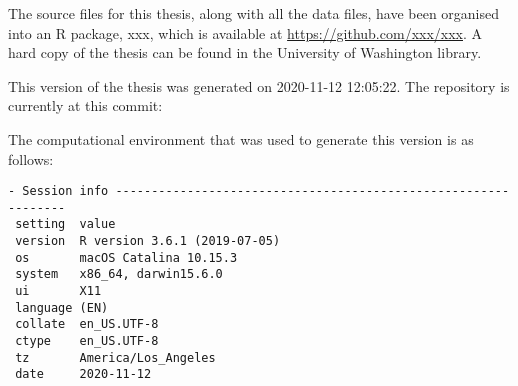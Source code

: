 \documentclass [11pt, proquest] {uwthesis}[2015/03/03]
\begin{document}
The source files for this thesis, along with all the data files, have
been organised into an R package, xxx, which is available at
\url{https://github.com/xxx/xxx}. A hard copy of the thesis can be found
in the University of Washington library.

This version of the thesis was generated on 2020-11-12 12:05:22. The
repository is currently at this commit:

The computational environment that was used to generate this version is
as follows:
\begin{verbatim}
- Session info ---------------------------------------------------------------
 setting  value                       
 version  R version 3.6.1 (2019-07-05)
 os       macOS Catalina 10.15.3      
 system   x86_64, darwin15.6.0        
 ui       X11                         
 language (EN)                        
 collate  en_US.UTF-8                 
 ctype    en_US.UTF-8                 
 tz       America/Los_Angeles         
 date     2020-11-12                  


\end{verbatim}
\end{document}
